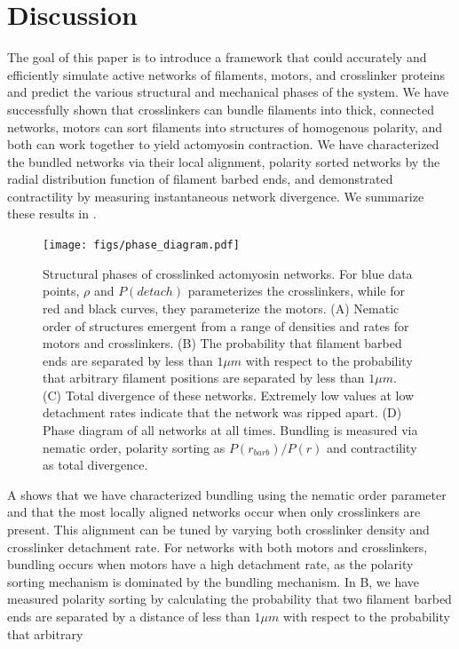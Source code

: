 \documentclass[12pt]{article}
\begin{document}
\section{Discussion}
The goal of this paper is to introduce a framework that could accurately and
efficiently simulate active networks of filaments, motors, and crosslinker 
proteins and predict the various structural and mechanical phases of the system.
We have successfully shown that crosslinkers can bundle filaments into thick,
connected networks, motors can sort filaments into structures of homogenous 
polarity, and both can work together to yield actomyosin contraction. We have
characterized the bundled networks via their local alignment, polarity sorted 
networks by the radial distribution function of filament barbed ends, and 
demonstrated contractility by measuring instantaneous network divergence. 
We summarize these results in .
\begin{figure}[H]
  \centering
  \texttt{[image: figs/phase\_diagram.pdf]}
  \caption{Structural phases of crosslinked actomyosin networks. For blue 
    data points, $\rho$ and $P(detach)$ parameterizes the crosslinkers, 
    while for red and black curves, they parameterize the motors.
  (A) Nematic order of structures emergent from a range of densities and 
  rates for motors and crosslinkers. 
  (B) The probability that filament barbed ends are separated by less
than $1\mu m$ with respect to the probability that arbitrary filament positions 
are separated by less than $1\mu m$.
(C) Total divergence of these networks. Extremely low values at low detachment 
rates indicate that the network was ripped apart.
(D) Phase diagram of all networks at all times. Bundling is measured via nematic
order, polarity sorting as $P(r_{barb})/P(r)$ and contractility as total 
divergence. }
  \label{fig:phases}
\end{figure}
A shows that we have characterized bundling using the nematic 
order parameter and that the most locally aligned networks occur when only 
crosslinkers are present. 
This alignment can be tuned by varying both crosslinker density and 
crosslinker detachment rate. For networks with both motors and crosslinkers, 
bundling occurs when motors have a high detachment rate, as the polarity sorting
mechanism is dominated by the bundling mechanism. 
In B, we have measured polarity sorting by calculating 
the probability that two filament barbed ends are separated by a 
distance of less than $1\mu m$ with respect to the probability that arbitrary 
\end{document}

